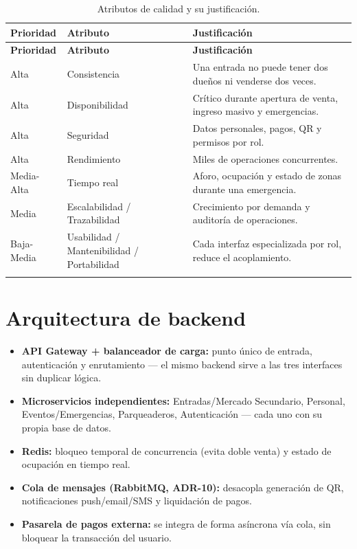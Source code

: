 \documentclass[12pt,a4paper]{article}
\begin{document}
\begin{longtable}{p{2.2cm}p{3cm}p{8.5cm}}
\toprule
\textbf{Prioridad} & \textbf{Atributo} & \textbf{Justificación}\\
\midrule
\endfirsthead
\toprule
\textbf{Prioridad} & \textbf{Atributo} & \textbf{Justificación}\\
\midrule
\endhead
Alta & Consistencia & Una entrada no puede tener dos dueños ni venderse dos veces.\\
Alta & Disponibilidad & Crítico durante apertura de venta, ingreso masivo y emergencias.\\
Alta & Seguridad & Datos personales, pagos, QR y permisos por rol.\\
Alta & Rendimiento & Miles de operaciones concurrentes.\\
Media-Alta & Tiempo real & Aforo, ocupación y estado de zonas durante una emergencia.\\
Media & Escalabilidad / Trazabilidad & Crecimiento por demanda y auditoría de operaciones.\\
Baja-Media & Usabilidad / Mantenibilidad / Portabilidad & Cada interfaz especializada por rol,
reduce el acoplamiento.\\
\bottomrule
\caption{Atributos de calidad y su justificación.}
\end{longtable}

\section{Arquitectura de backend}

\begin{itemize}
\item \textbf{API Gateway + balanceador de carga:} punto único de entrada, autenticación y
enrutamiento --- el mismo backend sirve a las tres interfaces sin duplicar lógica.
\item \textbf{Microservicios independientes:} Entradas/Mercado Secundario, Personal,
Eventos/Emergencias, Parqueaderos, Autenticación --- cada uno con su propia base de datos.
\item \textbf{Redis:} bloqueo temporal de concurrencia (evita doble venta) y estado de ocupación
en tiempo real.
\item \textbf{Cola de mensajes (RabbitMQ, ADR-10):} desacopla generación de QR, notificaciones
push/email/SMS y liquidación de pagos.
\item \textbf{Pasarela de pagos externa:} se integra de forma asíncrona vía cola, sin bloquear la
transacción del usuario.
\end{itemize}
\end{document}
